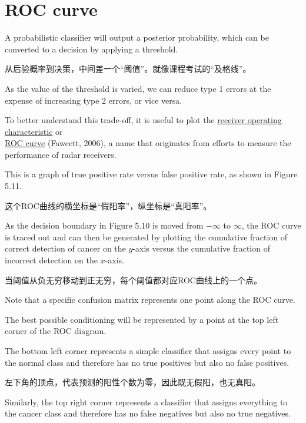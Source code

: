 \documentclass{article}
\begin{document}
\section{ROC curve}

A probabilistic classifier will output a posterior probability, which can be converted to a decision by applying a threshold. 

{\color{red}
从后验概率到决策，中间差一个“阈值”。就像课程考试的“及格线”。
}

As the value of the threshold is varied, we can reduce type 1 errors at the expense of increasing type 2 errors, or vice versa. 

To better understand this trade-off, it is useful to plot the \underline{\color{red}receiver operating characteristic} or \\ 
\underline{\color{red}ROC curve} (Fawcett, 2006), a name that originates from efforts to measure the performance of radar receivers. 

This is a graph of true positive rate versus false positive rate, as shown in Figure 5.11.

{\color{red}
这个ROC曲线的横坐标是“假阳率”，纵坐标是“真阳率”。
}

As the decision boundary in Figure 5.10 is moved from $-\infty$ to $\infty$, the ROC curve is traced out and can then be generated by plotting the cumulative fraction of correct detection of cancer on the $y$-axis versus the cumulative fraction of incorrect detection on the $x$-axis. 

{\color{red}
当阈值从负无穷移动到正无穷，每个阈值都对应ROC曲线上的一个点。
}

Note that a specific confusion matrix represents one point along the ROC curve. 

The best possible conditioning will be represented by a point at the top left corner of the ROC diagram. 

The bottom left corner represents a simple classifier that assigns every point to the normal class and therefore has no true positives but also no false positives. 

{\color{red}
左下角的顶点，代表预测的阳性个数为零，因此既无假阳，也无真阳。
}

Similarly, the top right corner represents a classifier that assigns everything to the cancer class and therefore has no false negatives but also no true negatives. 
\end{document}
